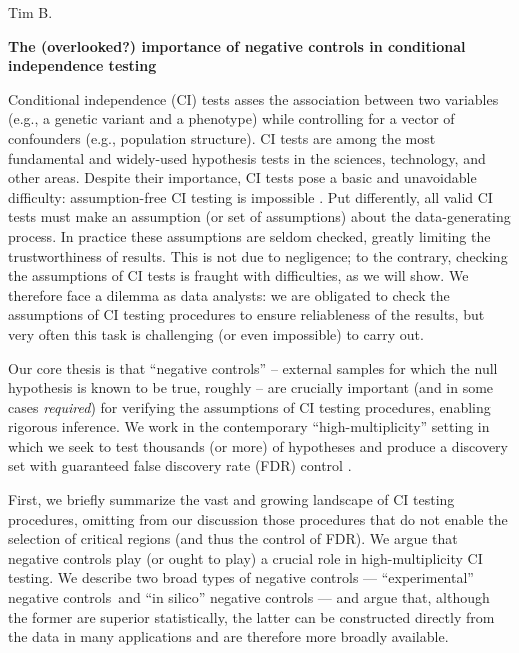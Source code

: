 \documentclass[12pt]{article}
\begin{document}
	\noindent
	Tim B.
	\begin{center}
		\textbf{The (overlooked?) importance of negative controls in conditional independence testing}
	\end{center}

Conditional independence (CI) tests asses the association between two variables (e.g., a genetic variant and a phenotype) while controlling for a vector of confounders (e.g., population structure). CI tests are among the most fundamental and widely-used hypothesis tests in the sciences, technology, and other areas. Despite their importance, CI tests pose a basic and unavoidable difficulty: assumption-free CI testing is impossible \parencite{Shah2020,Kim2021}. Put differently, all valid CI tests must make an assumption (or set of assumptions) about the data-generating process. In practice these assumptions are seldom checked, greatly limiting the trustworthiness of results. This is not due to negligence; to the contrary, checking the assumptions of CI tests is fraught with difficulties, as we will show. We therefore face a dilemma as data analysts: we are obligated to check the assumptions of CI testing procedures to ensure reliableness of the results, but very often this task is challenging (or even impossible) to carry out.

Our core thesis is that ``negative controls'' -- external samples for which the null hypothesis is known to be true, roughly  -- are crucially important (and in some cases \textit{required}) for verifying the assumptions of CI testing procedures, enabling rigorous inference. We work in the contemporary ``high-multiplicity'' setting in which we seek to test thousands (or more) of hypotheses and produce a discovery set with guaranteed false discovery rate (FDR) control \parencite{Benjamini1995, Li2021}.

First, we briefly summarize the vast and growing landscape of CI testing procedures, omitting from our discussion those procedures that do not enable the selection of critical regions (and thus the control of FDR). We argue that negative controls play (or ought to play) a crucial role in high-multiplicity CI testing. We describe two broad types of negative controls --- ``experimental'' negative controls and ``in silico'' negative controls --- and argue that, although the former are superior statistically, the latter can be constructed directly from the data in many applications and are therefore more broadly available.
\end{document}
